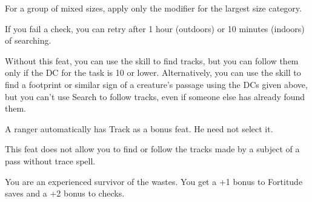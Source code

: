 {

For a group of mixed sizes, apply only the modifier for the largest size category.

If you fail a  check, you can retry after 1 hour (outdoors) or 10 minutes (indoors) of searching.}
{Without this feat, you can use the  skill to find tracks, but you can follow them only if the DC for the task is 10 or lower. Alternatively, you can use the  skill to find a footprint or similar sign of a creature's passage using the DCs given above, but you can't use Search to follow tracks, even if someone else has already found them.}
{A ranger automatically has Track as a bonus feat. He need not select it.

This feat does not allow you to find or follow the tracks made by a subject of a pass without trace spell.}

{You are an experienced survivor of the wastes.}{}
{You get a +1 bonus to Fortitude saves and a +2 bonus to  checks.}{}{}

